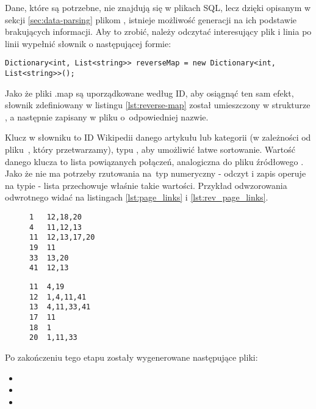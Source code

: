 Dane, które są potrzebne, nie znajdują się w plikach SQL, lecz dzięki opisanym w sekcji \ref{sec:data-parsing} plikom , istnieje możliwość generacji na ich podstawie brakujących informacji. Aby to zrobić, należy odczytać interesujący plik  i linia po linii wypełnić słownik o następującej formie:

\begin{lstlisting}[caption={Słownik przechowujący odwzorowanie odwrotne}, label=lst:reverse-map]
Dictionary<int, List<string>> reverseMap = new Dictionary<int, List<string>>();
\end{lstlisting}

Jako że pliki .map są uporządkowane według ID, aby osiągnąć ten sam efekt, słownik zdefiniowany w listingu \ref{lst:reverse-map} został umieszczony w strukturze , a następnie zapisany w pliku o~odpowiedniej nazwie. 

Klucz w słowniku to ID Wikipedii danego artykułu lub kategorii (w zależności od pliku~, który przetwarzamy), typu , aby umożliwić łatwe sortowanie. Wartość danego klucza to lista powiązanych połączeń, analogiczna do pliku źródłowego . Jako że nie ma potrzeby rzutowania na~typ numeryczny - odczyt i zapis operuje na typie  - lista przechowuje właśnie takie wartości. Przykład odwzorowania odwrotnego widać na listingach \ref{lst:page_links} i \ref{lst:rev_page_links}.

\begin{figure}[!h]
\begin{center}
    \begin{minipage}[c]{0.45\linewidth}
        \begin{lstlisting}[frame=single,caption={Przykładowy fragment pliku \lstinline{pagelinks.map}},label=lst:page_links]
1   12,18,20
4   11,12,13
11  12,13,17,20
19  11
33  13,20
41  12,13
\end{lstlisting}
    \end{minipage}
    \hspace{1em}
    \begin{minipage}[c]{0.45\linewidth}
        \begin{lstlisting}[frame=single,caption={Odwzorowanie odwrotne z listingu \ref{lst:page_links} (fragment \lstinline{R\_pagelinks.map})},label=lst:rev_page_links]
11  4,19
12  1,4,11,41
13  4,11,33,41
17  11
18  1
20  1,11,33
\end{lstlisting}
\end{minipage}
\end{center}
\end{figure}
Po zakończeniu tego etapu zostały wygenerowane następujące pliki:
\begin{itemize}
    \setlength\itemsep{0.2em}
    \item {}
    \item {}
    \item {}
\end{itemize}

